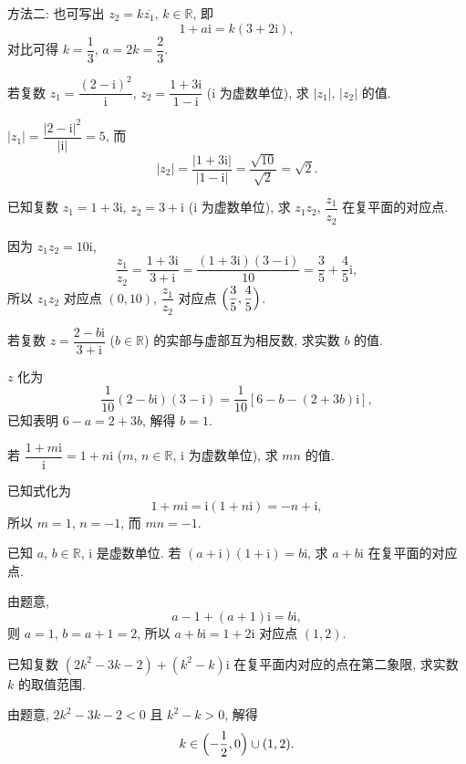     方法二: 也可写出 $z_2= k\overline{z_1}$, $k\in\mathbb{R}$, 即
    \[1+a\mathrm{i}= k(3+2\mathrm{i}),\]
    对比可得 $k= \dfrac13$, $a= 2k= \dfrac23$.
\endsolution

\begin{exercise}
    若复数 $z_1=\dfrac{(2-\mathrm{i})^2}{\mathrm{i}}$, $z_2= \dfrac{1+3\mathrm{i}}{1-\mathrm{i}}$ ($\mathrm{i}$ 为虚数单位), 求 $|z_1|$, $|z_2|$ 的值.
\end{exercise}
\beginsolution
    $|z_1|= \dfrac{|2-\mathrm{i}|^2}{|\mathrm{i}|}= 5$, 而
    \[|z_2|= \dfrac{|1+3\mathrm{i}|}{|1-\mathrm{i}|}
        = \frac{\sqrt{10}}{\sqrt{2}}= \sqrt{2}.\]
\endsolution

\begin{exercise}
    已知复数 $z_1 =1+3\mathrm{i}$, $z_2 =3+\mathrm{i}$ ($\mathrm{i}$ 为虚数单位), 求 $z_1z_2$, $\dfrac{z_1}{z_2}$ 在复平面的对应点.
\end{exercise}
\beginsolution
    因为 $z_1z_2= 10\mathrm{i}$, 
    \[\dfrac{z_1}{z_2}= \frac{1+3\mathrm{i}}{3+\mathrm{i}}
        = \frac{(1+3\mathrm{i})(3-\mathrm{i})}{10}
        = \frac35+ \frac45\mathrm{i},\]
    所以 $z_1z_2$ 对应点 $(0,10)$, $\dfrac{z_1}{z_2}$ 对应点 $\Bigl(\dfrac35, \dfrac45\Bigr)$.
\endsolution

\begin{exercise}
    若复数 $z=\dfrac{2-b\mathrm{i}}{3+\mathrm{i}}$ ($b\in\mathbb{R}$) 的实部与虚部互为相反数, 求实数 $b$ 的值.
\end{exercise}
\beginsolution
    $z$ 化为
    \[\frac1{10}(2-b\mathrm{i})(3-\mathrm{i})
        = \frac1{10}[6-b- (2+3b)\mathrm{i}],\]
    已知表明 $6-a= 2+3b$, 解得 $b=1$.
\endsolution

\begin{exercise}
    若 $\dfrac{1+m\mathrm{i}}{\mathrm{i}}= 1+n\mathrm{i}$ ($m$, $n\in\mathbb{R}$, $\mathrm{i}$ 为虚数单位), 求 $mn$ 的值.
\end{exercise}
\beginsolution
    已知式化为
    \[1+m\mathrm{i}= \mathrm{i}(1+n\mathrm{i})= -n+\mathrm{i},\]
    所以 $m=1$, $n=-1$, 而 $mn=-1$.
\endsolution

\begin{exercise}
    已知 $a$, $b\in\mathbb{R}$, $\mathrm{i}$ 是虚数单位. 若 $(a+\mathrm{i})(1+\mathrm{i})=b\mathrm{i}$, 求 $a+b\mathrm{i}$ 在复平面的对应点.
\end{exercise}
\beginsolution
    由题意,
    \[a-1+(a+1)\mathrm{i}= b\mathrm{i},\]
    则 $a=1$, $b= a+1= 2$, 所以 $a+b\mathrm{i}= 1+2\mathrm{i}$ 对应点 $(1,2)$. 
\endsolution

\begin{exercise}
    已知复数 $(2k^2 -3k-2)+(k^2-k)\mathrm{i}$ 在复平面内对应的点在第二象限, 求实数 $k$ 的取值范围.
\end{exercise}
\beginsolution
    由题意, $2k^2-3k-2<0$ 且 $k^2-k>0$, 解得
    \[k\in \Bigl(-\frac12,0\Bigr)\cup (1,2).\]
\endsolution